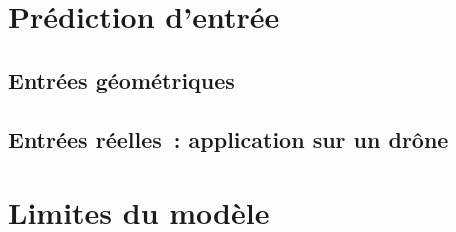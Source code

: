 \documentclass[../main]{subfiles}
\begin{document}
\section{Prédiction d'entrée}



\subsection{Entrées géométriques}


\subsection{Entrées réelles~: application sur un drône}


\section{Limites du modèle}


\ifSubfilesClassLoaded{
    \printbibliography
}{}
\end{document}
